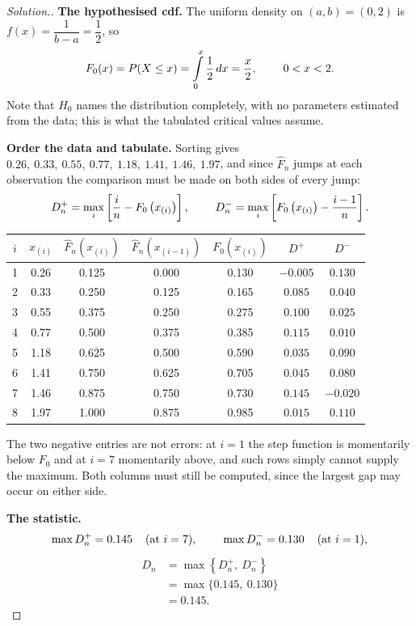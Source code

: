 \documentclass[11pt,a4paper]{article}
\theoremstyle{definition}
\newenvironment{solution}
  {\renewcommand{\qedsymbol}{}\begin{proof}[\textit{Solution}.]}
  {\end{proof}}
\begin{document}
\begin{solution}
\textbf{The hypothesised cdf.} The uniform density on $(a,b)=(0,2)$ is
$f(x)=\dfrac{1}{b-a}=\dfrac{1}{2}$, so
$$F_0(x)=P(X\leq x)=\int\limits^{x}_{0}\dfrac{1}{2}\,dx=\dfrac{x}{2},
\hspace{0.8cm}0<x<2 .$$
Note that $H_0$ names the distribution completely, with no parameters estimated
from the data; this is what the tabulated critical values assume.

\textbf{Order the data and tabulate.} Sorting gives
$0.26,\ 0.33,\ 0.55,\ 0.77,\ 1.18,\ 1.41,\ 1.46,\ 1.97$, and since
$\widehat{F}_n$ jumps at each observation the comparison must be made on both sides
of every jump:
$$D^{+}_n=\max_{i}\left[\dfrac{i}{n}-F_0\left(x_{(i)}\right)\right],
\hspace{0.8cm}
D^{-}_n=\max_{i}\left[F_0\left(x_{(i)}\right)-\dfrac{i-1}{n}\right].$$

\begin{table}[H]
\centering
\begin{tabular}{c|c|c|c|c|c|c}
$i$&$x_{(i)}$&$\widehat{F}_n\left(x_{(i)}\right)$&$\widehat{F}_n\left(x_{(i-1)}\right)$&$F_0\left(x_{(i)}\right)$&$D^{+}$&$D^{-}$\\
\hline
1&0.26&0.125&0.000&0.130&$-0.005$&$0.130$\\
2&0.33&0.250&0.125&0.165&$0.085$&$0.040$\\
3&0.55&0.375&0.250&0.275&$0.100$&$0.025$\\
4&0.77&0.500&0.375&0.385&$0.115$&$0.010$\\
5&1.18&0.625&0.500&0.590&$0.035$&$0.090$\\
6&1.41&0.750&0.625&0.705&$0.045$&$0.080$\\
7&1.46&0.875&0.750&0.730&$\mathbf{0.145}$&$-0.020$\\
8&1.97&1.000&0.875&0.985&$0.015$&$0.110$\\
\hline
\end{tabular}
\end{table}

The two negative entries are not errors: at $i=1$ the step function is momentarily
below $F_0$ and at $i=7$ momentarily above, and such rows simply cannot supply the
maximum. Both columns must still be computed, since the largest gap may occur on
either side.

\textbf{The statistic.}
$$\max D^{+}_n=0.145\hspace{0.4cm}(\text{at } i=7),\hspace{0.8cm}
\max D^{-}_n=0.130\hspace{0.4cm}(\text{at } i=1),$$
\begin{align*}
D_n &=\max\left\{D^{+}_n,\ D^{-}_n\right\}\\
    &=\max\{0.145,\ 0.130\}\\
    &=0.145 .
\end{align*}


\end{solution}
\end{document}
